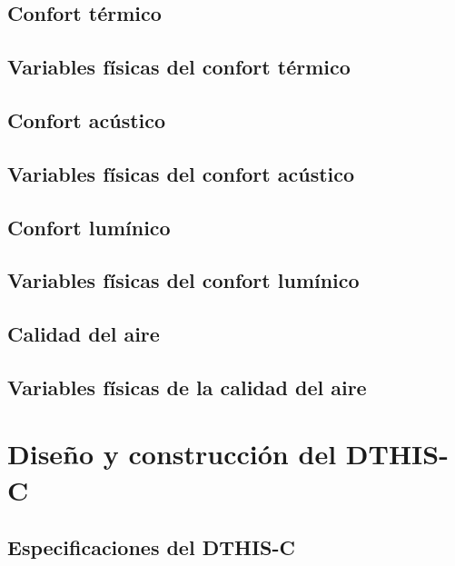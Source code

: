 \documentclass[
  letterpaper,
  DIV=11,
  numbers=noendperiod]{scrreprt}
\begin{document}
\section{Confort térmico}\label{confort-tuxe9rmico}

\section{Variables físicas del confort
térmico}\label{variables-fuxedsicas-del-confort-tuxe9rmico}

\section{Confort acústico}\label{confort-acuxfastico}

\section{Variables físicas del confort
acústico}\label{variables-fuxedsicas-del-confort-acuxfastico}

\section{Confort lumínico}\label{confort-lumuxednico}

\section{Variables físicas del confort
lumínico}\label{variables-fuxedsicas-del-confort-lumuxednico}

\section{Calidad del aire}\label{calidad-del-aire}

\section{Variables físicas de la calidad del
aire}\label{variables-fuxedsicas-de-la-calidad-del-aire}


\chapter{Diseño y construcción del
DTHIS-C}\label{diseuxf1o-y-construcciuxf3n-del-dthis-c}

\section{Especificaciones del
DTHIS-C}\label{especificaciones-del-dthis-c}
\end{document}
